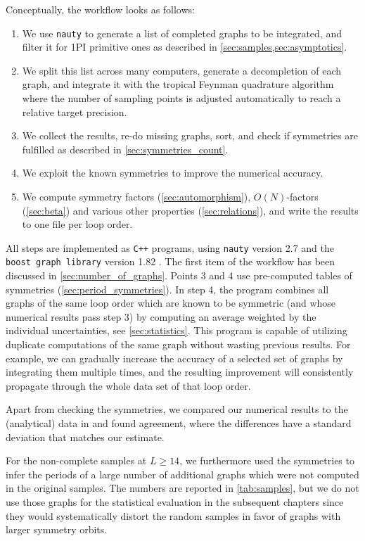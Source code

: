 \documentclass[11pt,a4paper]{article}
\renewcommand{\|}{\rule[-0.4ex]{0.2ex}{1.2em}}
\begin{document}
Conceptually, the workflow looks as follows:
\begin{enumerate}
	\item We use \texttt{nauty}  to generate a list of completed graphs to be integrated, and filter it for 1PI primitive ones as described in \cref{sec:samples,sec:asymptotics}.  
	\item We split this list across many computers, generate a decompletion of each graph, and integrate it with the tropical Feynman quadrature algorithm where  the number of sampling points is adjusted automatically to reach a relative target precision.
	\item We collect the results, re-do missing graphs, sort, and check if symmetries are fulfilled  as described in \cref{sec:symmetries_count}.
	\item We exploit the known symmetries to improve the numerical accuracy.
	\item We compute symmetry factors (\cref{sec:automorphism}), $O(N)$-factors (\cref{sec:beta}) and various other   properties (\cref{sec:relations}), and write the results to one file per loop order.
\end{enumerate}
All steps are implemented as \texttt{C++} programs, using \texttt{nauty} version 2.7 \cite{mckay_practical_2014} and the \texttt{boost graph library} version 1.82 \cite{siek_boost_2001}. The first item of the workflow has been discussed in \cref{sec:number_of_graphs}. Points 3 and 4 use pre-computed tables of symmetries (\cref{sec:period_symmetries}). In step 4, the program combines all graphs of the same loop order which are known to be symmetric (and whose numerical results pass step 3) by computing an average weighted by the individual uncertainties, see \cref{sec:statistics}. This program is capable of utilizing duplicate computations of the same graph  without wasting previous results. For example, we can gradually increase the accuracy of a selected set of graphs by integrating them multiple times, and the resulting improvement will consistently propagate through the whole data set of that loop order.


Apart from checking the symmetries, we compared our numerical results to the (analytical) data in \cite{panzer_galois_2017} and found agreement, where the differences have a standard deviation that matches our estimate. 

For the non-complete samples at $L \geq 14$, we furthermore used the symmetries to infer the periods of a large number of additional graphs which were not computed in the original samples. The numbers are reported in \cref{tab:samples}, but we do not use those graphs for the statistical evaluation in the subsequent chapters since they would systematically distort the random samples in favor of graphs with larger symmetry orbits. 
\end{document}
